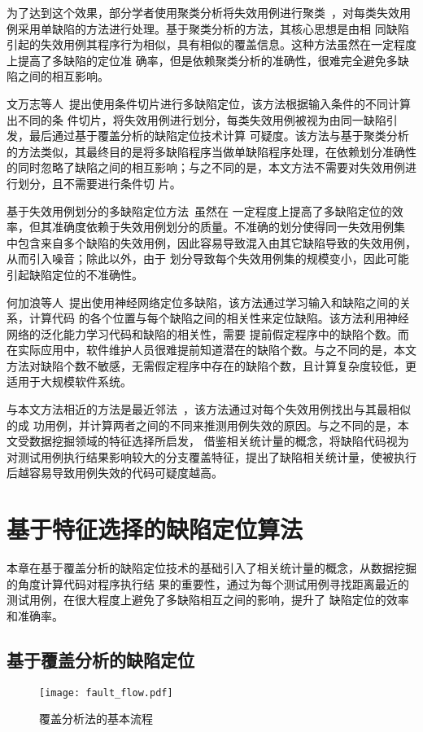 为了达到这个效果，部分学者使用聚类分析将失效用例进行聚类~\cite{jones2007debugging,
zheng2006statistical}，对每类失效用例采用单缺陷的方法进行处理。基于聚类分析的方法，其核心思想是由相
同缺陷引起的失效用例其程序行为相似，具有相似的覆盖信息。这种方法虽然在一定程度上提高了多缺陷的定位准
确率，但是依赖聚类分析的准确性，很难完全避免多缺陷之间的相互影响。

文万志等人~\cite{conslice2013}提出使用条件切片进行多缺陷定位，该方法根据输入条件的不同计算出不同的条
件切片，将失效用例进行划分，每类失效用例被视为由同一缺陷引发，最后通过基于覆盖分析的缺陷定位技术计算
可疑度。该方法与基于聚类分析的方法类似，其最终目的是将多缺陷程序当做单缺陷程序处理，在依赖划分准确性
的同时忽略了缺陷之间的相互影响；与之不同的是，本文方法不需要对失效用例进行划分，且不需要进行条件切
片。

基于失效用例划分的多缺陷定位方法~\cite{zheng2006statistical, jones2007debugging, conslice2013}虽然在
一定程度上提高了多缺陷定位的效率，但其准确度依赖于失效用例划分的质量。不准确的划分使得同一失效用例集
中包含来自多个缺陷的失效用例，因此容易导致混入由其它缺陷导致的失效用例，从而引入噪音；除此以外，由于
划分导致每个失效用例集的规模变小，因此可能引起缺陷定位的不准确性。

何加浪等人~\cite{neural2013}提出使用神经网络定位多缺陷，该方法通过学习输入和缺陷之间的关系，计算代码
的各个位置与每个缺陷之间的相关性来定位缺陷。该方法利用神经网络的泛化能力学习代码和缺陷的相关性，需要
提前假定程序中的缺陷个数。而在实际应用中，软件维护人员很难提前知道潜在的缺陷个数。与之不同的是，本文
方法对缺陷个数不敏感，无需假定程序中存在的缺陷个数，且计算复杂度较低，更适用于大规模软件系统。

与本文方法相近的方法是最近邻法~\cite{renieres2003fault}，该方法通过对每个失效用例找出与其最相似的成
功用例，并计算两者之间的不同来推测用例失效的原因。与之不同的是，本文受数据挖掘领域的特征选择所启发，
借鉴相关统计量的概念，将缺陷代码视为对测试用例执行结果影响较大的分支覆盖特征，提出了缺陷相关统计量，使被执行
后越容易导致用例失效的代码可疑度越高。

\section{基于特征选择的缺陷定位算法}
本章在基于覆盖分析的缺陷定位技术的基础引入了相关统计量的概念，从数据挖掘的角度计算代码对程序执行结
果的重要性，通过为每个测试用例寻找距离最近的测试用例，在很大程度上避免了多缺陷相互之间的影响，提升了
缺陷定位的效率和准确率。

\subsection{基于覆盖分析的缺陷定位}
\begin{figure}[htp]
      \centering
      \texttt{[image: fault\_flow.pdf]}
      \caption{覆盖分析法的基本流程}
      \label{fig:fault_flow}
\end{figure}

